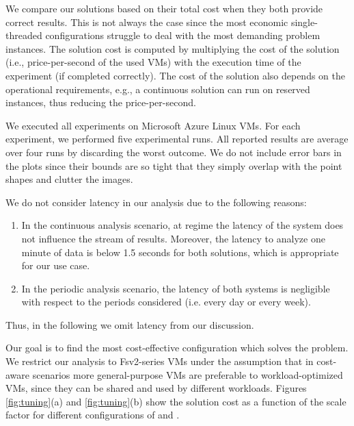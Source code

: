 {We compare our solutions based on their total cost when they both provide correct results. This is not always the case since the most economic single-threaded configurations struggle to deal with the most demanding problem instances. The solution cost is computed by multiplying the cost of the solution (i.e., price-per-second of the used VMs) with the execution time of the experiment (if completed correctly). The cost of the solution also depends on the operational requirements, e.g., a continuous solution can run on reserved instances, thus reducing the price-per-second.

We executed all experiments on Microsoft Azure Linux VMs. For each experiment, we performed five experimental runs. All reported results are average over four runs by discarding the worst outcome. We do not include error bars in the plots since their bounds are so tight that they simply overlap with the point shapes and clutter the images.

We do not consider latency in our analysis due to the following reasons:
\begin{enumerate}
\item In the continuous analysis scenario, at regime the latency of the system does not influence the stream of results. Moreover, the latency to analyze one minute of data is below 1.5 seconds for both solutions, which is appropriate for our use case.
\item In the periodic analysis scenario, the latency of both systems is negligible with respect to the periods considered (i.e. every day or every week).
\end{enumerate}
Thus, in the following we omit latency from our discussion.

Our goal is to find the most cost-effective configuration which solves the problem. We restrict our analysis to Fsv2-series VMs under the assumption that in cost-aware scenarios more general-purpose VMs are preferable to workload-optimized VMs, since they can be shared and used by different workloads. Figures \ref{fig:tuning}(a) and \ref{fig:tuning}(b) show the solution cost as a function of the scale factor for different configurations of \sti{} and \sparkdi{}. 

}
